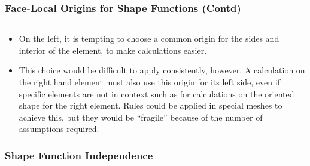 \documentclass[compress]{beamer}
\begin{document}
\begin{frame}
  \frametitle{Face-Local Origins for Shape Functions (Contd)}
  \begin{columns}
  \end{columns}
  \begin{itemize}[<+->]
    \item On the left, it is tempting to choose a common origin for the sides and interior of the element, to make calculations easier.
    \item This choice would be difficult to apply consistently, however. A calculation on the right hand element must also use this origin
      for its left side, even if specific elements are not in context such as for calculations on the oriented shape for the right element.
      Rules could be applied in special meshes to achieve this, but they would be ``fragile'' because of the number of assumptions required.
  \end{itemize}
\end{frame}

\subsubsection{Shape Function Independence}
\end{document}
